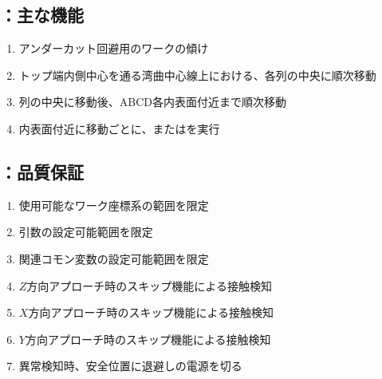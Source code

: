 \subsection{\DLone：主な機能}
\begin{enumerate}[label*=\sarrow]
\item アンダーカット回避用のワークの傾け
\item トップ端内側中心を通る湾曲中心線上における、\Dimple 各列の中央に順次移動
\item \Dimple 列の中央に移動後、ABCD各内表面付近まで順次移動
\item 内表面付近に移動ごとに、\DLtwoAC または\DLtwoBD を実行
\end{enumerate}


\clearpage
\subsection{\DLone：品質保証}
\begin{enumerate}[label*=\sarrow]
\item 使用可能なワーク座標系の範囲を限定
\item {}引数の設定可能範囲を限定
\item 関連コモン変数の設定可能範囲を限定
\item $Z$方向アプローチ時のスキップ機能による接触検知
\item $X$方向アプローチ時のスキップ機能による接触検知
\item $Y$方向アプローチ時のスキップ機能による接触検知
\item 異常検知時、安全位置に退避し\TouchSensorProbe の電源を切る
\end{enumerate}



\clearpage


